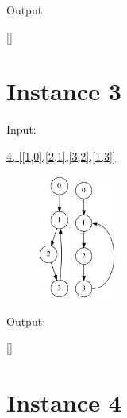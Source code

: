 \documentclass[10pt]{article}
\begin{document}
\squishlist
  \item \parbox{40pt}{Output:} \url{[]}
\squishend


\section*{Instance 3}

\squishlist
  \item \parbox{40pt}{Input:}  \url{4, [[1,0],[2,1],[3,2],[1,3]]}
\squishend
\begin{figure}[h!]
  \hspace{50pt}
  \includegraphics[width=30pt]{Input/Graph_3a.gv.png}
  \hspace{50pt}
  \hspace{50pt}
  \includegraphics[width=40pt]{Input/Graph_3b.gv.png}
  \hspace{50pt}
  \hspace{50pt}
\end{figure}

\squishlist
  \item \parbox{40pt}{Output:} \url{[]}
\squishend


\section*{Instance 4}
\end{document}
